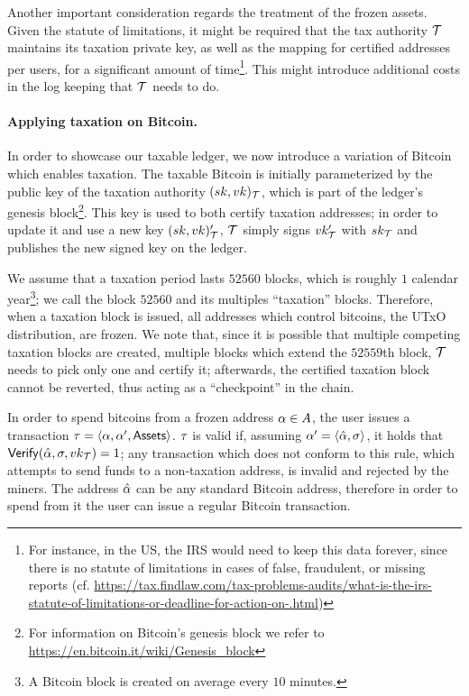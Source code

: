 Another important consideration regards the treatment of the frozen assets.
Given the statute of limitations, it might be required that the tax authority
$\mathcal{T}$ maintains its taxation private key, as well as the mapping for
certified addresses per users, for a significant amount of time\footnote{For
instance, in the US, the IRS would need to keep this data forever, since there
is no statute of limitations in cases of false, fraudulent, or missing reports
(cf.
\url{https://tax.findlaw.com/tax-problems-audits/what-is-the-irs-statute-of-limitations-or-deadline-for-action-on-.html})}.
This might introduce additional costs in the log keeping that $\mathcal{T}$ needs
to do.

\paragraph{Applying taxation on Bitcoin.}

In order to showcase our taxable ledger, we now introduce a variation of
Bitcoin which enables taxation. The taxable Bitcoin is initially parameterized
by the public key of the taxation authority $(sk, vk)_\mathcal{T}$, which is part
of the ledger's genesis block\footnote{For information on Bitcoin's genesis
block we refer to \url{https://en.bitcoin.it/wiki/Genesis_block}}. This key is
used to both certify taxation addresses; in order to update it and use a new
key $(sk, vk)_\mathcal{T}'$, $\mathcal{T}$ simply signs $vk_\mathcal{T}'$ with
$sk_\mathcal{T}$ and publishes the new signed key on the ledger.

We assume that a taxation period lasts $52560$ blocks, which is roughly $1$
calendar year\footnote{A Bitcoin block is created on average every $10$
minutes.}; we call the block $52560$ and its multiples ``taxation'' blocks.
Therefore, when a taxation block is issued, all addresses which control
bitcoins, \ie the UTxO distribution, are frozen. We note that, since it is
possible that multiple competing taxation blocks are created, \eg multiple
blocks which extend the $52559$th block, $\mathcal{T}$ needs to pick only one and
certify it; afterwards, the certified taxation block cannot be reverted, thus
acting as a ``checkpoint'' in the chain.

In order to spend bitcoins from a frozen address $\alpha \in A$, the user
issues a transaction $\tau = \langle \alpha, \alpha', \mathsf{Assets}
\rangle$. $\tau$ is valid if, assuming $\alpha' = \langle
\hat{\alpha}, \sigma \rangle$, it holds that $\mathsf{Verify}(\hat{\alpha}, \sigma,
vk_\mathcal{T}) = 1$; any transaction which does not conform to this rule,
\ie which attempts to send funds to a non-taxation address, is invalid and
rejected by the miners. The address $\hat{\alpha}$ can be any standard
Bitcoin address, therefore in order to spend from it the user can issue a
regular Bitcoin transaction.
